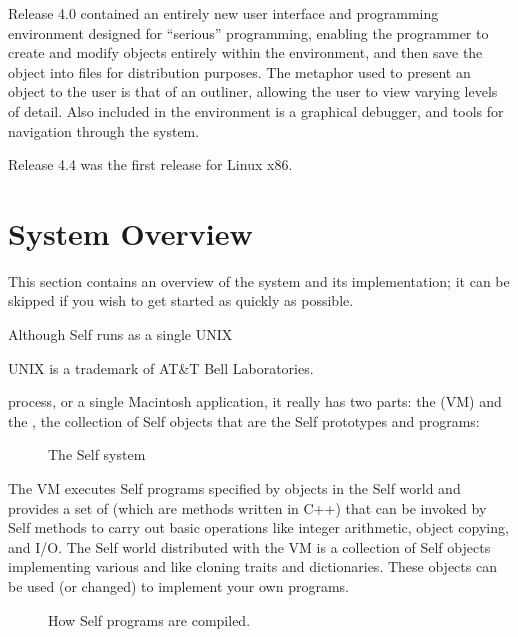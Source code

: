 \documentclass[letterpaper,10pt,english]{sphinxmanual}
\begin{document}
Release 4.0 contained an entirely new user interface and programming environment designed for “serious” programming, enabling the programmer to create and modify objects entirely within the environment, and then save the object into files for distribution purposes. The metaphor used to present an object to the user is that of an outliner, allowing the user to view varying levels of detail. Also included in the environment is a graphical debugger, and tools for navigation through the system.

Release 4.4 was the first release for Linux x86.


\section{System Overview}
\label{\detokenize{intro:system-overview}}
This section contains an overview of the system and its implementation; it can be skipped if you wish to get started as quickly as possible.

Although Self runs as a single UNIX %
\begin{footnote}[1]\sphinxAtStartFootnote
UNIX is a trademark of AT\&T Bell Laboratories.
%
\end{footnote} process, or a single Macintosh application, it really has two parts: the  (VM) and the , the collection of Self objects that are the Self prototypes and programs:
\begin{figure}[htbp]
\centering
\capstart

\noindent{}
\caption{The Self system}\label{\detokenize{intro:id2}}\end{figure}

The VM executes Self programs specified by objects in the Self world and provides a set of  (which are methods written in C++) that can be invoked by Self methods to carry out basic operations like integer arithmetic, object copying, and I/O. The Self world distributed with the VM is a collection of Self objects implementing various  and  like cloning traits and dictionaries. These objects can be used (or changed) to implement your own programs.
\begin{figure}[htbp]
\centering
\capstart

\noindent{}
\caption{How Self programs are compiled.}\label{\detokenize{intro:fighowselfprogcompiled}}\label{\detokenize{intro:id3}}\end{figure}
\end{document}
